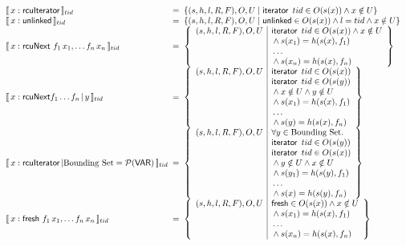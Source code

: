 \begin{figure*}[!htbp]
\centering
\[
\begin{array}{l@{\;\;=\;\;}l}
\llbracket \, x : \textsf{rcuIterator}\,  \rrbracket_{tid}
&
\{ (s,h,l,R,F), O,U \mid \textsf{iterator } \, tid\in  O(s(x)) 
\land x \notin U
\}
\\

\llbracket \, x : \textsf{unlinked} \, \rrbracket_{tid}
&
\{ (s,h,l,R,F), O,U \mid \textsf{unlinked}\in  O(s(x)) 
\land l = tid 
\land x \notin U
\}

\\

\llbracket \, x : \textsf{rcuNext } f_1\,x_1, \ldots f_n\,x_n  \, \rrbracket_{tid}
&
\left
\{ 
\begin{array}{l|l}
(s,h,l,R,F), O,U 
&
\textsf{iterator } \, tid\in  O(s(x)) 
\land x \notin U\\
&{}\land  s(x_1) = h(s(x), f_1) \\
&{}\ldots \\
&{}\land s(x_n) = h(s(x), f_n)
\end{array}
\right\}
\\
\llbracket \, x : \textsf{rcuNext} f_1 \ldots f_n \, | \, y  \, \rrbracket_{tid}
&
\left
\{
\begin{array}{l|l}
(s,h,l,R,F),O,U
&
  \textsf{iterator } \, tid \in  O(s(x)) \\
&{}\textsf{iterator } \, tid \in O(s(y)) \\
&{}\land x \notin U \land y \notin U \,  \\
&{}\land  s(x_1) = h(s(x), f_1)  \\ &{}\ldots  \\ &{}\land s(y) = h(s(x), f_n)
\end{array}
\right\}
\\
\llbracket \, x : \textsf{rcuIterator} \, | \text{Bounding Set} = \mathcal{P}(\textsf{VAR})  \, \rrbracket_{tid}
&
\left
\{
\begin{array}{l|l}
(s,h,l,R,F),O,U
&
  \forall y \in \text{Bounding Set} \ldotp \\
&{}\textsf{iterator } \, tid\in  O(s(y)) \\
&{}\textsf{iterator }\, tid \in O(s(x)) \\
&{}\land y \notin U \land x \notin U\\
&{}\land  s(y_1) = h(s(y), f_1) \\ &{} \ldots \\ &{}\land s(x) = h(s(y), f_n)
\end{array}
\right\}
\\
\llbracket \, x : \textsf{fresh } f_1\,x_1, \ldots f_n\,x_n \,  \rrbracket_{tid}
&
\left
\{ 
\begin{array}{l|l}
(s,h,l,R,F), O,U 
&
\textsf{fresh}\in  O(s(x)) 
\land x \notin U\\
&{}\land  s(x_1) = h(s(x), f_1) \\
&{}\ldots \\
&{}\land s(x_n) = h(s(x), f_n)
\end{array}
\right\}
\\



\end{array}\]
\end{figure*}
